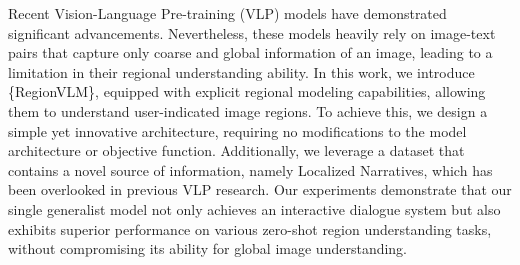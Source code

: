 Recent Vision-Language Pre-training (VLP) models have demonstrated significant advancements. Nevertheless, these models heavily rely on image-text pairs that capture only coarse and global information of an image, leading to a limitation in their regional understanding ability. In this work, we introduce \{RegionVLM\}, equipped with explicit regional modeling capabilities, allowing them to understand user-indicated image regions. To achieve this, we design a simple yet innovative architecture, requiring no modifications to the model architecture or objective function. Additionally, we leverage a dataset that contains a novel source of information, namely Localized Narratives, which has been overlooked in previous VLP research. Our experiments demonstrate that our single generalist model not only achieves an interactive dialogue system but also exhibits superior performance on various zero-shot region understanding tasks, without compromising its ability for global image understanding.